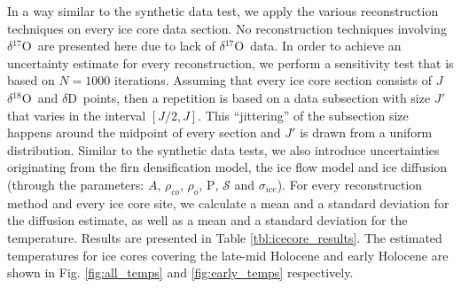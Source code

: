 \documentclass[11pt, draftcls, onecolumn]{IEEEtran} %
\numberwithin{equation}{section}
\numberwithin{table}{section}
\numberwithin{figure}{section}
\newcommand{\delOx}{$\delta{}^{18}\mathrm{O}$}
\newcommand{\delOxb}{$\delta{}^{17}\mathrm{O}$}
\newcommand{\delD}{$\delta\mathrm{D}$}
\begin{document}
In a way similar to the synthetic data test, we apply the various reconstruction techniques on every ice core data
section. No reconstruction techniques involving \delOxb ~are presented here due to lack of 
\delOxb ~data. 
In order to achieve an uncertainty estimate for every reconstruction, we 
perform a sensitivity test that is based on $N = 1000$ iterations. 
Assuming that every ice core section 
consists of $J$ \delOx ~and \delD ~points, then a repetition is based on a 
data subsection with size $J'$ that varies in the interval $\left[ J/2, J \right]$. 
This ``jittering'' of the subsection size happens around the midpoint of every section and $J'$ is 
drawn from a uniform distribution. 
Similar to the synthetic data tests, we also introduce uncertainties originating from the firn densification model, the ice flow  model
and ice diffusion (through the parameters: $A$, $\rho_{co}$, $\rho_o$, $\mathrm{P}$, $\mathcal{S}$ and $\sigma_{ice}$).
For every reconstruction method and every ice core site, we
calculate a mean and a standard deviation for the diffusion estimate, as well as a mean and a standard 
deviation for the temperature. 
Results are presented in Table \ref{tbl:icecore_results}. 
The estimated temperatures for ice cores covering the late-mid Holocene and early Holocene are 
shown in Fig. \ref{fig:all_temps} and \ref{fig:early_temps} respectively.


\end{document}
